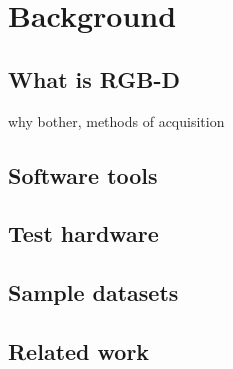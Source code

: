 \chapter{Background}
\label{cha:background}


\section{What is RGB-D}
\label{sec:motivation}
 why bother, methods of acquisition


\section{Software tools}
\label{sec:software}


\section{Test hardware}
\label{sec:testhardware}


\section{Sample datasets}
\label{sec:datasets}


\section{Related work}
\label{sec:related}


